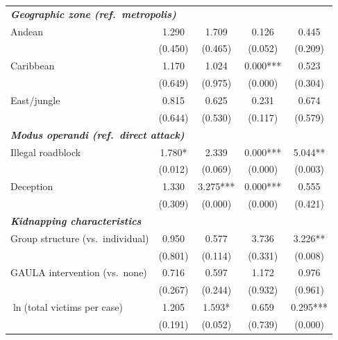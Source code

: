 {\begin{longtable}{lcccc}
\multicolumn{5}{l}{\textbf{\textit{Geographic zone (ref.\ metropolis)}}} \\
Andean & 1.290 & 1.709 & 0.126 & 0.445 \\
       & {\scriptsize (0.450)} & {\scriptsize (0.465)} & {\scriptsize (0.052)} & {\scriptsize (0.209)} \\
Caribbean & 1.170 & 1.024 & 0.000*** & 0.523 \\
          & {\scriptsize (0.649)} & {\scriptsize (0.975)} & {\scriptsize (0.000)} & {\scriptsize (0.304)} \\
East/jungle & 0.815 & 0.625 & 0.231 & 0.674 \\
            & {\scriptsize (0.644)} & {\scriptsize (0.530)} & {\scriptsize (0.117)} & {\scriptsize (0.579)} \\
\midrule

\multicolumn{5}{l}{\textbf{\textit{Modus operandi (ref.\ direct attack)}}} \\
Illegal roadblock & 1.780* & 2.339 & 0.000*** & 5.044** \\
                  & {\scriptsize (0.012)} & {\scriptsize (0.069)} & {\scriptsize (0.000)} & {\scriptsize (0.003)} \\
Deception & 1.330 & 3.275*** & 0.000*** & 0.555 \\
          & {\scriptsize (0.309)} & {\scriptsize (0.000)} & {\scriptsize (0.000)} & {\scriptsize (0.421)} \\
\midrule

\multicolumn{5}{l}{\textbf{\textit{Kidnapping characteristics}}} \\
Group structure (vs.\ individual) & 0.950 & 0.577 & 3.736 & 3.226** \\
                                  & {\scriptsize (0.801)} & {\scriptsize (0.114)} & {\scriptsize (0.331)} & {\scriptsize (0.008)} \\
GAULA intervention (vs.\ none) & 0.716 & 0.597 & 1.172 & 0.976 \\
                               & {\scriptsize (0.267)} & {\scriptsize (0.244)} & {\scriptsize (0.932)} & {\scriptsize (0.961)} \\
$\ln$(total victims per case) & 1.205 & 1.593* & 0.659 & 0.295*** \\
                              & {\scriptsize (0.191)} & {\scriptsize (0.052)} & {\scriptsize (0.739)} & {\scriptsize (0.000)} \\
\midrule


\end{longtable}}
